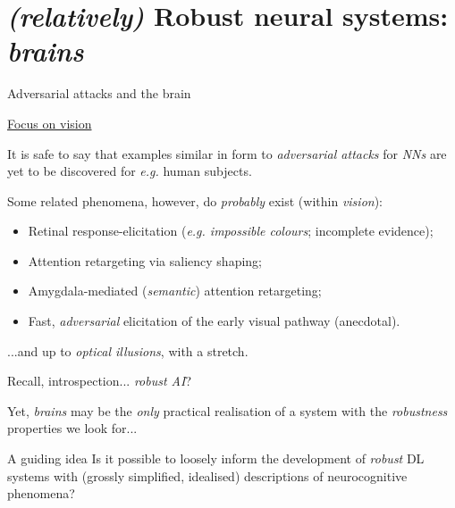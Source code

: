 
\section{ \textit{(relatively)} Robust neural systems: \textit{brains}}{

    \begin{frame}{ Adversarial attacks and the brain}

        \begin{center}
            \underline{Focus on vision}
        \end{center}

        It is safe to say that examples similar in form to \textit{adversarial attacks} for \textit{NNs} are \alert{yet to be discovered} for \textit{e.g.} human subjects.

        Some related phenomena, however, do \textit{probably} exist (within \textit{vision}):
        \begin{itemize}
            \item \alert{Retinal} response-elicitation (\textit{e.g. impossible colours}; incomplete evidence);
            \item \alert{Attention} retargeting via saliency shaping;
            \item Amygdala-mediated (\textit{\alert{semantic}}) attention retargeting;
            \item \alert{Fast}, \textit{adversarial} elicitation of the \alert{early} visual pathway (anecdotal).
        \end{itemize}

    ...and up to \textit{optical illusions}, with a stretch.
    \end{frame}

    \begin{frame}{ Recall, introspection... \textit{robust AI}?}

        Yet, \textit{brains} may be the \textit{only} practical realisation of a system with the \textit{robustness} properties we look for...

        \begin{block}{ A guiding idea}
            Is it possible to loosely inform the development of \textit{robust} DL systems with (grossly simplified, idealised) descriptions of \alert{neurocognitive} phenomena?
        \end{block}


\end{frame}}
